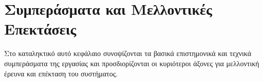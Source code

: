 
\chapter{Συμπεράσματα και Μελλοντικές Επεκτάσεις}
\label{ch:conclusion}

Στο καταληκτικό αυτό κεφάλαιο συνοψίζονται τα βασικά επιστημονικά και τεχνικά συμπεράσματα της εργασίας και προσδιορίζονται οι κυριότεροι άξονες για μελλοντική έρευνα και επέκταση του συστήματος.
